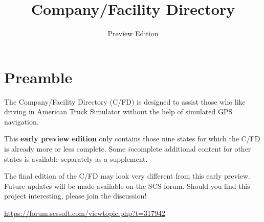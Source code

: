
\subject{City location descriptions for ATS}
\title{Company\!/Facility Directory}
\subtitle{Preview Edition}




\maketitle

\vspace{5mm}
\section*{Preamble}

{
\justifying

The Company/Facility Directory (C/FD) is designed to assist those who like driving in American Truck Simulator without the help of simulated GPS navigation.

This \textbf{early preview edition} only contains those nine states for which the C/FD is already more or less complete.
Some \emph{in}complete additional content for other states is available separately as a supplement.



The final edition of the C/FD may look very different from this early preview.
Future updates will be made available on the SCS forum.
Should you find this project interesting, please join the discussion!

\centering \vspace{1ex}
\url{https://forum.scssoft.com/viewtopic.php?t=317942} \par
}

